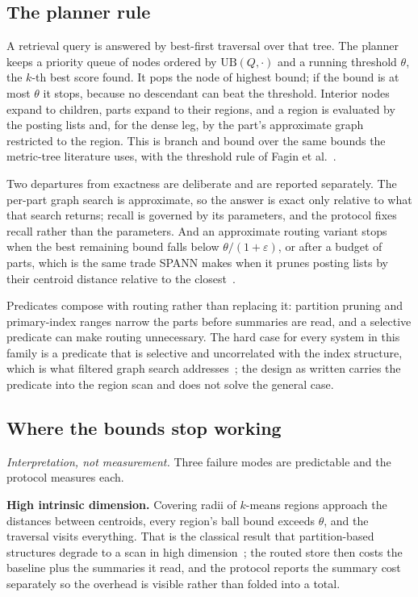 \subsection{The planner rule}

\proposed{} A retrieval query is answered by best-first traversal over that
tree. The planner keeps a priority queue of nodes ordered by
$\mathrm{UB}(Q,\cdot)$ and a running threshold $\theta$, the $k$-th best score
found. It pops the node of highest bound; if the bound is at most $\theta$ it
stops, because no descendant can beat the threshold. Interior nodes expand to
children, parts expand to their regions, and a region is evaluated by the
posting lists and, for the dense leg, by the part's approximate graph
restricted to the region. This is branch and bound over the same bounds the
metric-tree literature uses, with the threshold rule of Fagin et
al.~\cite{fagin2003ta}.

Two departures from exactness are deliberate and are reported separately. The
per-part graph search is approximate, so the answer is exact only relative to
what that search returns; recall is governed by its parameters, and the
protocol fixes recall rather than the parameters. And an approximate routing
variant stops when the best remaining bound falls below $\theta/(1+\varepsilon)$,
or after a budget of parts, which is the same trade SPANN makes when it prunes
posting lists by their centroid distance relative to the
closest~\cite{chen2021spann}.

Predicates compose with routing rather than replacing it: partition pruning and
primary-index ranges narrow the parts before summaries are read, and a
selective predicate can make routing unnecessary. The hard case for every
system in this family is a predicate that is selective and uncorrelated with
the index structure, which is what filtered graph search
addresses~\cite{gollapudi2023filtered,patel2024acorn}; the design as written
carries the predicate into the region scan and does not solve the general case.

\subsection{Where the bounds stop working}

\proposed{} \emph{Interpretation, not measurement.} Three failure modes are
predictable and the protocol measures each.

\textbf{High intrinsic dimension.} Covering radii of $k$-means regions approach
the distances between centroids, every region's ball bound exceeds $\theta$,
and the traversal visits everything. That is the classical result that
partition-based structures degrade to a scan in high
dimension~\cite{weber1998quantitative,beyer1999nn}; the routed store then costs
the baseline plus the summaries it read, and the protocol reports the summary
cost separately so the overhead is visible rather than folded into a total.


